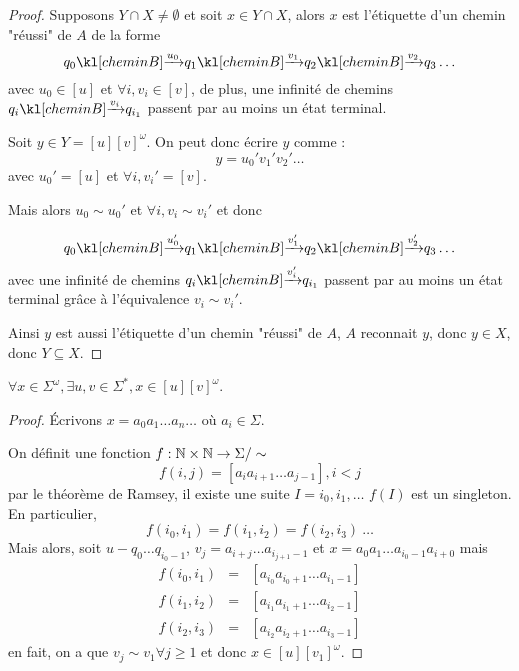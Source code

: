 \begin{proof}
	Supposons $Y \cap X \neq \emptyset$ et soit $x \in Y \cap X$, alors $x$ est l'étiquette d'un chemin "réussi" de $A$
	de la forme
	$$q_0 \cheminArrow {u_0} q_1 \cheminArrow {v_1} q_2 \cheminArrow {v_2} q_3 \ldots$$
	avec $u_0 \in [u]$ et $\forall i, v_i \in [v]$, de plus,
	une infinité de chemins $\chemin {q_i} {q_{i_1}} {v_i}$ passent par au moins un état terminal.

	Soit $y \in Y = [u][v]^{\omega}$. On peut donc écrire $y$ comme :
	$$ y = u_0'v_1'v_2'\ldots$$
	avec $u_0' = [u]$ et $\forall i, v_i' = [v]$.

	Mais alors $u_0 \sim u_0'$ et $\forall i, v_i \sim v_i'$ et donc

	$$q_0 \cheminArrow {u_0'} q_1 \cheminArrow {v_1'} q_2 \cheminArrow {v_2'} q_3 \ldots$$
	avec une infinité de chemins $\chemin {q_i} {q_{i_1}} {v'_i}$ passent par au moins un état terminal grâce à l'équivalence
	$v_i \sim v_i'$.

	Ainsi $y$ est aussi l'étiquette d'un chemin "réussi" de $A$, \cad $A$ reconnait $y$, donc $y \in X$, donc $Y \subseteq X$.
\end{proof}



\begin{prop}\label{prop:buchi2}
	$\forall x \in \Sigma^{\omega}, \exists u,v \in \Sigma^*, x \in [u][v]^{\omega}$.
\end{prop}

\begin{proof}
	Écrivons $x = a_0a_1 \ldots a_n \ldots$ où $a_i \in \Sigma$.

	On définit une fonction $f : \mathbb{N} \times \mathbb{N} \to \Sigma/\sim$
	$$f(i,j) = [a_ia_{i+1}\ldots a_{j-1}], i < j$$
	par le théorème de Ramsey, il existe une suite $I = i_0,i_1,\ldots$ \tlq $f(I)$ est un singleton.
	En particulier,
	$$f(i_0,i_1) = f(i_1,i_2) = f(i_2,i_3) \ \ldots$$
	Mais alors, soit $u - q_0 \ldots q_{i_0-1}$, $v_j = a_{i+j} \ldots a_{{i_{j+1} -1}}$ et $x = a_0a_ 1\ldots a_{i_0-1}a_{i+0}$
	mais
	\begin{eqnarray*}
		f(i_0,i_1) &=& [a_{i_0} a_{i_0+1}\ldots a_{i_1-1}] \\
		f(i_1,i_2) &=& [a_{i_1} a_{i_1+1}\ldots a_{i_2-1}] \\
		f(i_2,i_3) &=& [a_{i_2} a_{i_2+1}\ldots a_{i_3-1}]
	\end{eqnarray*}
	en fait, on a que $v_j \sim v_1 \forall j \geq 1$ et donc $x \in [u][v_1]^{\omega}$.
\end{proof}

